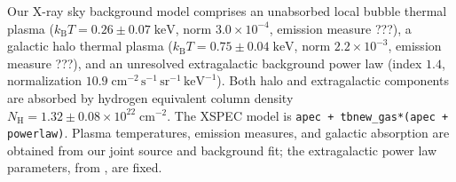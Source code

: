 \documentclass[preprint2,tighten,trackchanges]{aastex6}
\newcommand*{\mt}{\mathrm}
\newcommand*{\unit}[1]{\;\mt{#1}}  %
\newcommand*{\abt}{\mathord{\sim}} %
\newcommand*{\nH}{N_{\mathrm{H}}}
\newcommand*{\nHUnits}{\times 10^{22} \unit{cm^{-2}}}
\newcommand*{\kB}{k_{\mathrm{B}}}
\begin{document}
Our X-ray sky background model comprises
an unabsorbed local bubble thermal plasma
($\kB T = 0.26 \pm 0.07 \unit{keV}$, norm $3.0 \times 10^{-4}$,
    emission measure ???),
a galactic halo thermal plasma
($\kB T = 0.75 \pm 0.04 \unit{keV}$, norm $2.2 \times 10^{-3}$,
    emission measure ???),
and an unresolved extragalactic background power law
(index $1.4$, normalization $10.9 \unit{cm^{-2}\,s^{-1}\,sr^{-1}\,keV^{-1}}$).
Both halo and extragalactic components are absorbed by hydrogen equivalent
column density $\nH = 1.32 \pm 0.08 \nHUnits$.
The XSPEC model is \texttt{apec + tbnew\_gas*(apec + powerlaw)}.
Plasma temperatures, emission measures, and galactic absorption are obtained
from our joint source and background fit;
the extragalactic power law parameters, from \citet{hickox2006}, are fixed.


%
%
\end{document}
